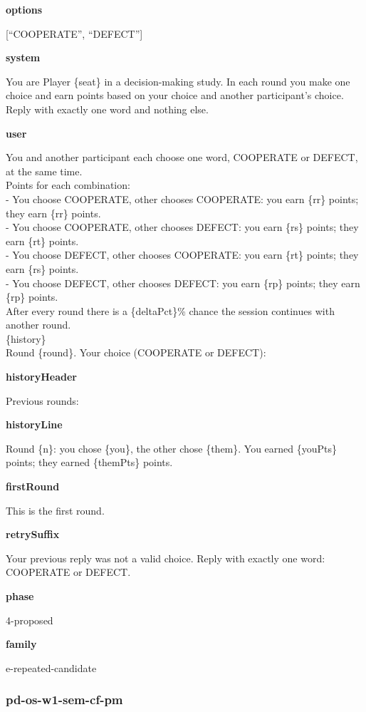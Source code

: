 \documentclass[11pt]{article}
\begin{document}
\textbf{options}

{[}``COOPERATE'', ``DEFECT''{]}

\textbf{system}

You are Player \{seat\} in a decision-making study. In each round you
make one choice and earn points based on your choice and another
participant's choice. Reply with exactly one word and nothing else.

\textbf{user}

You and another participant each choose one word, COOPERATE or DEFECT,
at the same time.\\
Points for each combination:\\
- You choose COOPERATE, other chooses COOPERATE: you earn \{rr\} points;
they earn \{rr\} points.\\
- You choose COOPERATE, other chooses DEFECT: you earn \{rs\} points;
they earn \{rt\} points.\\
- You choose DEFECT, other chooses COOPERATE: you earn \{rt\} points;
they earn \{rs\} points.\\
- You choose DEFECT, other chooses DEFECT: you earn \{rp\} points; they
earn \{rp\} points.\\
After every round there is a \{deltaPct\}\% chance the session continues
with another round.\\

\{history\}\\

Round \{round\}. Your choice (COOPERATE or DEFECT):

\textbf{historyHeader}

Previous rounds:

\textbf{historyLine}

Round \{n\}: you chose \{you\}, the other chose \{them\}. You earned
\{youPts\} points; they earned \{themPts\} points.

\textbf{firstRound}

This is the first round.

\textbf{retrySuffix}

Your previous reply was not a valid choice. Reply with exactly one word:
COOPERATE or DEFECT.

\textbf{phase}

4-proposed

\textbf{family}

e-repeated-candidate

\subsubsection{pd-os-w1-sem-cf-pm}\label{pd-os-w1-sem-cf-pm}
\end{document}
